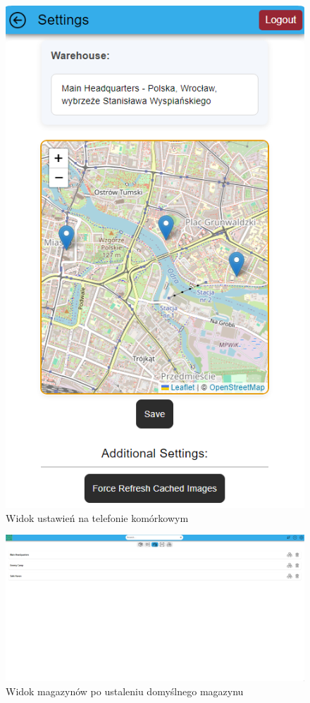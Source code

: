 \documentclass[../main.tex]{subfiles}
\begin{document}
            \begin{figure}[H]
                \centering
                \includegraphics[height=\getImageHeight]{images/app-mobile/app-settings-mobile.png}
                \caption{Widok ustawień na telefonie komórkowym}
                \label{fig:app-settings-mobile}
            \end{figure}

            \begin{figure}[H]
                \centering
                \includegraphics[width=\getImageWidth]{images/app-desktop/app-warehouses-with-default-desktop.png}
                \caption{Widok magazynów po ustaleniu domyślnego magazynu}
                \label{fig:app-warehouses-with-default-desktop}
            \end{figure}
\end{document}
